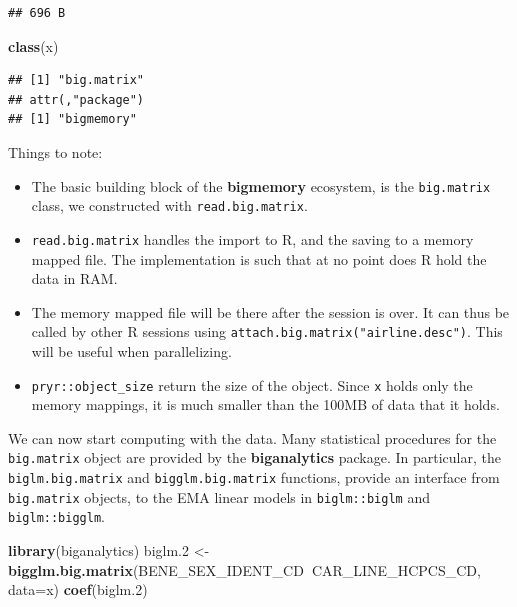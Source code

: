 \documentclass[]{book}
\newenvironment{Shaded}{\begin{snugshade}}{\end{snugshade}}
\newcommand{\DataTypeTok}[1]{\textcolor[rgb]{0.13,0.29,0.53}{#1}}
\newcommand{\FloatTok}[1]{\textcolor[rgb]{0.00,0.00,0.81}{#1}}
\newcommand{\KeywordTok}[1]{\textcolor[rgb]{0.13,0.29,0.53}{\textbf{#1}}}
\newcommand{\NormalTok}[1]{#1}
\newcommand{\OperatorTok}[1]{\textcolor[rgb]{0.81,0.36,0.00}{\textbf{#1}}}
\newcommand{\StringTok}[1]{\textcolor[rgb]{0.31,0.60,0.02}{#1}}
\providecommand{\tightlist}{%
  \setlength{\itemsep}{0pt}\setlength{\parskip}{0pt}}
\theoremstyle{definition}
\theoremstyle{definition}
\theoremstyle{definition}
\theoremstyle{remark}
\begin{document}
\begin{verbatim}
## 696 B
\end{verbatim}

\begin{Shaded}
\begin{Highlighting}[]
\KeywordTok{class}\NormalTok{(x)}
\end{Highlighting}
\end{Shaded}

\begin{verbatim}
## [1] "big.matrix"
## attr(,"package")
## [1] "bigmemory"
\end{verbatim}

Things to note:

\begin{itemize}
\tightlist
\item
  The basic building block of the \textbf{bigmemory} ecosystem, is the \texttt{big.matrix} class, we constructed with \texttt{read.big.matrix}.
\item
  \texttt{read.big.matrix} handles the import to R, and the saving to a memory mapped file. The implementation is such that at no point does R hold the data in RAM.
\item
  The memory mapped file will be there after the session is over. It can thus be called by other R sessions using \texttt{attach.big.matrix("airline.desc")}. This will be useful when parallelizing.
\item
  \texttt{pryr::object\_size} return the size of the object. Since \texttt{x} holds only the memory mappings, it is much smaller than the 100MB of data that it holds.
\end{itemize}

We can now start computing with the data.
Many statistical procedures for the \texttt{big.matrix} object are provided by the \textbf{biganalytics} package.
In particular, the \texttt{biglm.big.matrix} and \texttt{bigglm.big.matrix} functions, provide an interface from \texttt{big.matrix} objects, to the EMA linear models in \texttt{biglm::biglm} and \texttt{biglm::bigglm}.

\begin{Shaded}
\begin{Highlighting}[]
\KeywordTok{library}\NormalTok{(biganalytics)}
\NormalTok{biglm}\FloatTok{.2}\NormalTok{ <-}\StringTok{ }\KeywordTok{bigglm.big.matrix}\NormalTok{(BENE_SEX_IDENT_CD}\OperatorTok{~}\NormalTok{CAR_LINE_HCPCS_CD, }\DataTypeTok{data=}\NormalTok{x)}
\KeywordTok{coef}\NormalTok{(biglm}\FloatTok{.2}\NormalTok{)}
\end{Highlighting}
\end{Shaded}
\end{document}
